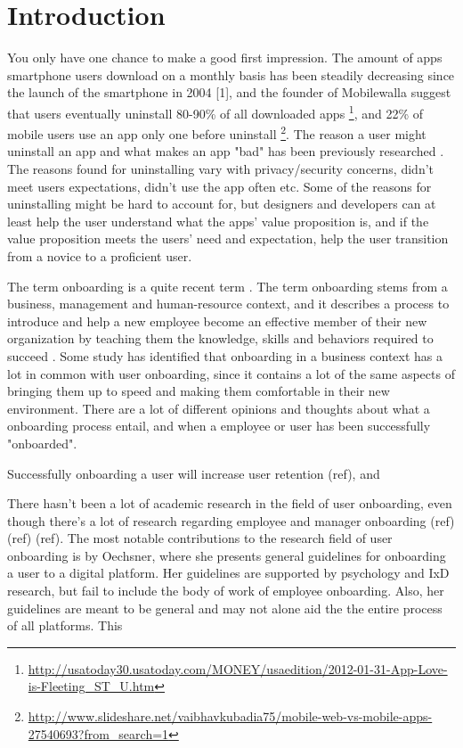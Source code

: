 \chapter{Introduction}
\label{chap:introduction}

You only have one chance to make a good first impression. The amount of apps smartphone users download on a monthly basis has been steadily decreasing since the launch of the smartphone in 2004 [1], and the founder of Mobilewalla suggest that users eventually uninstall 80-90\% of all downloaded apps \footnote{\url{http://usatoday30.usatoday.com/MONEY/usaedition/2012-01-31-App-Love-is-Fleeting\_ST\_U.htm}}, and 22\% of mobile users use an app only one before uninstall \footnote{\url{http://www.slideshare.net/vaibhavkubadia75/mobile-web-vs-mobile-apps-27540693?from_search=1}}. The reason a user might uninstall an app and what makes an app "bad" has been previously researched \cite{Lin2012} \cite{Shklovski} \cite{Song2014}. The reasons found for uninstalling vary with privacy/security concerns, didn't meet users expectations, didn't use the app often etc. Some of the reasons for uninstalling might be hard to account for, but designers and developers can at least help the user understand what the apps' value proposition is, and if the value proposition meets the users' need and expectation, help the user transition from a novice to a proficient user.

The term onboarding is a quite recent term \cite{Dai2007}. The term onboarding stems from a business, management and human-resource context, and it describes a process to introduce and help a new employee become an effective member of their new organization by teaching them the knowledge, skills and behaviors required to succeed \cite{Bauer2011}. Some study has identified that onboarding in a business context has a lot in common with user onboarding, since it contains a lot of the same aspects of bringing them up to speed and making them comfortable in their new environment. There are a lot of different opinions and thoughts about what a onboarding process entail, and when a employee or user has been successfully "onboarded".

Successfully onboarding a user will increase user retention (ref), and

There hasn't been a lot of academic research in the field of user onboarding, even though there's a lot of research regarding employee and manager onboarding (ref) (ref) (ref). The most notable contributions to the research field of user onboarding is by Oechsner, where she presents general guidelines for onboarding a user to a digital platform. Her guidelines are supported by psychology and IxD research, but fail to include the body of work of employee onboarding. Also, her guidelines are meant to be general and may not alone aid the the entire process of all platforms. This

